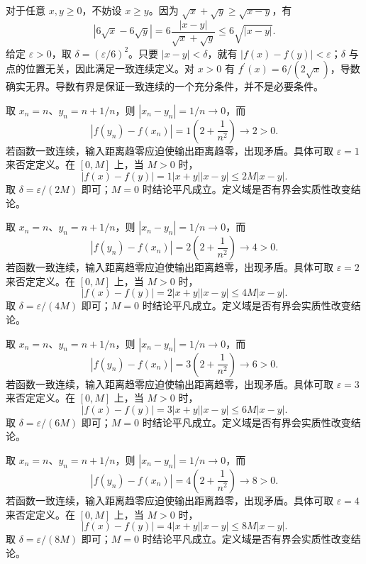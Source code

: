 \documentclass[12pt,fontset=fandol]{ctexart}
\begin{document}
\begin{solve}\label{ans:c6q18}
对于任意 $x,y\ge0$，不妨设 $x\ge y$。因为 $\sqrt x+\sqrt y\ge\sqrt{x-y}$，有
\[
|6\sqrt x-6\sqrt y|=6\frac{|x-y|}{\sqrt x+\sqrt y}\le 6\sqrt{|x-y|}.
\]
给定 $\varepsilon>0$，取 $\delta=(\varepsilon/6)^2$。只要 $|x-y|<\delta$，就有 $|f(x)-f(y)|<\varepsilon$；$\delta$ 与点的位置无关，因此满足一致连续定义。对 $x>0$ 有 $f^{\prime}(x)=6/(2\sqrt x)$，导数确实无界。导数有界是保证一致连续的一个充分条件，并不是必要条件。
\end{solve}

\begin{solve}\label{ans:c6q19}
取 $x_n=n$、$y_n=n+1/n$，则 $|x_n-y_n|=1/n\to0$，而
\[
|f(y_n)-f(x_n)|=1\left(2+\frac1{n^2}\right)\longrightarrow 2>0.
\]
若函数一致连续，输入距离趋零应迫使输出距离趋零，出现矛盾。具体可取 $\varepsilon=1$ 来否定定义。在 $[0,M]$ 上，当 $M>0$ 时，
\[
|f(x)-f(y)|=1|x+y||x-y|\le 2M|x-y|.
\]
取 $\delta=\varepsilon/(2M)$ 即可；$M=0$ 时结论平凡成立。定义域是否有界会实质性改变结论。
\end{solve}

\begin{solve}\label{ans:c6q20}
取 $x_n=n$、$y_n=n+1/n$，则 $|x_n-y_n|=1/n\to0$，而
\[
|f(y_n)-f(x_n)|=2\left(2+\frac1{n^2}\right)\longrightarrow 4>0.
\]
若函数一致连续，输入距离趋零应迫使输出距离趋零，出现矛盾。具体可取 $\varepsilon=2$ 来否定定义。在 $[0,M]$ 上，当 $M>0$ 时，
\[
|f(x)-f(y)|=2|x+y||x-y|\le 4M|x-y|.
\]
取 $\delta=\varepsilon/(4M)$ 即可；$M=0$ 时结论平凡成立。定义域是否有界会实质性改变结论。
\end{solve}

\begin{solve}\label{ans:c6q21}
取 $x_n=n$、$y_n=n+1/n$，则 $|x_n-y_n|=1/n\to0$，而
\[
|f(y_n)-f(x_n)|=3\left(2+\frac1{n^2}\right)\longrightarrow 6>0.
\]
若函数一致连续，输入距离趋零应迫使输出距离趋零，出现矛盾。具体可取 $\varepsilon=3$ 来否定定义。在 $[0,M]$ 上，当 $M>0$ 时，
\[
|f(x)-f(y)|=3|x+y||x-y|\le 6M|x-y|.
\]
取 $\delta=\varepsilon/(6M)$ 即可；$M=0$ 时结论平凡成立。定义域是否有界会实质性改变结论。
\end{solve}

\begin{solve}\label{ans:c6q22}
取 $x_n=n$、$y_n=n+1/n$，则 $|x_n-y_n|=1/n\to0$，而
\[
|f(y_n)-f(x_n)|=4\left(2+\frac1{n^2}\right)\longrightarrow 8>0.
\]
若函数一致连续，输入距离趋零应迫使输出距离趋零，出现矛盾。具体可取 $\varepsilon=4$ 来否定定义。在 $[0,M]$ 上，当 $M>0$ 时，
\[
|f(x)-f(y)|=4|x+y||x-y|\le 8M|x-y|.
\]
取 $\delta=\varepsilon/(8M)$ 即可；$M=0$ 时结论平凡成立。定义域是否有界会实质性改变结论。
\end{solve}
\end{document}
